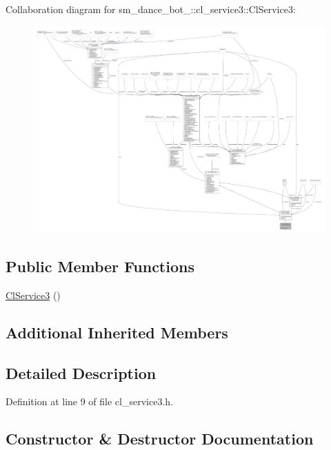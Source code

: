 Collaboration diagram for sm\+\_\+dance\+\_\+bot\+\_\+:\+:cl\+\_\+service3\+:\+:Cl\+Service3\+:
\nopagebreak
\begin{figure}[H]
\begin{center}
\leavevmode
\includegraphics[width=350pt]{classsm__dance__bot__2_1_1cl__service3_1_1ClService3__coll__graph}
\end{center}
\end{figure}
\subsection*{Public Member Functions}
\begin{DoxyCompactItemize}
\item 
\hyperlink{classsm__dance__bot__2_1_1cl__service3_1_1ClService3_a5d6dc0acd1bea671fae423d576779b60}{Cl\+Service3} ()
\end{DoxyCompactItemize}
\subsection*{Additional Inherited Members}


\subsection{Detailed Description}


Definition at line 9 of file cl\+\_\+service3.\+h.



\subsection{Constructor \& Destructor Documentation}
\mbox{\label{classsm__dance__bot__2_1_1cl__service3_1_1ClService3_a5d6dc0acd1bea671fae423d576779b60}} 

